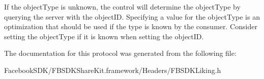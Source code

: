 If the object\-Type is unknown, the control will determine the object\-Type by querying the server with the object\-I\-D. Specifying a value for the object\-Type is an optimization that should be used if the type is known by the consumer. Consider setting the object\-Type if it is known when setting the object\-I\-D. 

The documentation for this protocol was generated from the following file\-:\begin{DoxyCompactItemize}
\item 
Facebook\-S\-D\-K/\-F\-B\-S\-D\-K\-Share\-Kit.\-framework/\-Headers/F\-B\-S\-D\-K\-Liking.\-h\end{DoxyCompactItemize}
